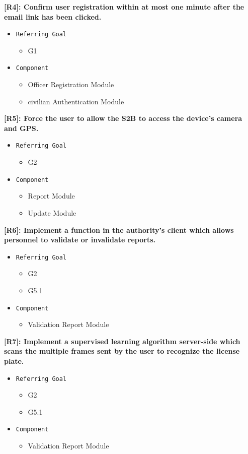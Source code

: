 \documentclass[12pt,a4paper]{article}
\begin{document}
\textbf{[R4]: Confirm user registration within at most one minute after the email link has been clicked.}
\begin{itemize}
	\item \texttt{Referring Goal}
	\begin{itemize}
		\item G1
	\end{itemize}
	\item \texttt{Component}
	\begin{itemize}
		\item Officer Registration Module
		\item civilian Authentication Module
	\end{itemize}
\end{itemize}
\textbf{[R5]: Force the user to allow the S2B to access the device's camera and GPS.}
\begin{itemize}
	\item \texttt{Referring Goal}
	\begin{itemize}
		\item G2
	\end{itemize}
	\item \texttt{Component}
	\begin{itemize}
		\item Report Module
		\item Update Module
	\end{itemize}
\end{itemize}
\textbf{[R6]: Implement a function in the authority's client which allows personnel to validate or invalidate reports.}
\begin{itemize}
	\item \texttt{Referring Goal}
	\begin{itemize}
		\item G2
		\item G5.1
	\end{itemize}
	\item \texttt{Component}
	\begin{itemize}
		\item Validation Report Module
	\end{itemize}
\end{itemize}
\textbf{[R7]: Implement a supervised learning algorithm server-side which scans the multiple frames sent by the user to recognize the license plate.}
\begin{itemize}
	\item \texttt{Referring Goal}
	\begin{itemize}
		\item G2
		\item G5.1
	\end{itemize}
	\item \texttt{Component}
	\begin{itemize}
		\item Validation Report Module
	\end{itemize}
\end{itemize}
\end{document}
